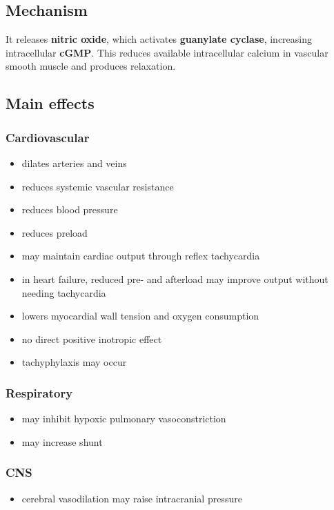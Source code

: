 \documentclass[11pt,a4paper]{article}
\begin{document}
\subsection{Mechanism}

It releases \textbf{nitric oxide}, which activates \textbf{guanylate cyclase}, increasing intracellular \textbf{cGMP}. This reduces available intracellular calcium in vascular smooth muscle and produces relaxation.

\subsection{Main effects}

\subsubsection*{Cardiovascular}
\begin{itemize}
    \item dilates arteries and veins
    \item reduces systemic vascular resistance
    \item reduces blood pressure
    \item reduces preload
    \item may maintain cardiac output through reflex tachycardia
    \item in heart failure, reduced pre- and afterload may improve output without needing tachycardia
    \item lowers myocardial wall tension and oxygen consumption
    \item no direct positive inotropic effect
    \item tachyphylaxis may occur
\end{itemize}

\subsubsection*{Respiratory}
\begin{itemize}
    \item may inhibit hypoxic pulmonary vasoconstriction
    \item may increase shunt
\end{itemize}

\subsubsection*{CNS}
\begin{itemize}
    \item cerebral vasodilation may raise intracranial pressure
\end{itemize}
\end{document}

